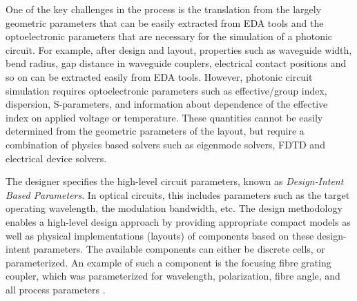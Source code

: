 \documentclass[journal]{spie}
\begin{document}
One of the key challenges in the process is the translation from the largely geometric parameters that can be easily extracted from EDA tools and the optoelectronic parameters that are necessary for the simulation of a photonic circuit. For example, after design and layout, properties such as waveguide width, bend radius, gap distance in waveguide couplers, electrical contact positions and so on can be extracted easily from EDA tools. However, photonic circuit simulation requires optoelectronic parameters such as effective/group index, dispersion, S-parameters, and information about dependence of the effective index on applied voltage or temperature. These quantities cannot be easily determined from the geometric parameters of the layout, but require a combination of physics based solvers such as eigenmode solvers, FDTD and electrical device solvers.



The designer specifies the high-level circuit parameters, known as \emph {Design-Intent Based Parameters}.  In optical circuits, this includes parameters such as the target operating wavelength, the modulation bandwidth, etc.  The design methodology enables a high-level design approach by providing appropriate compact models as well as physical implementations (layouts) of components based on these design-intent parameters.  The available components can either be discrete cells, or parameterized.  An example of such a component is the focusing fibre grating coupler, which was parameterized for wavelength, polarization, fibre angle, and all process parameters \cite{wang2013universal}.
\end{document}
